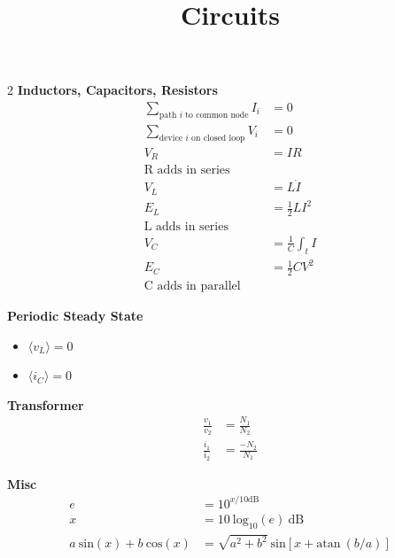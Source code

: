 \documentclass[12pt]{article}
\title{\vspace{-2em}Circuits}
\date{}
\begin{document}
\maketitle

\vspace{-4em}
\begin{multicols}{2}
  \textbf{Inductors, Capacitors, Resistors}
  \begin{align}
    \sum_{\textrm{path $i$ to common node}} I_i &= 0\\
    \sum_{\textrm{device $i$ on closed loop}} V_i &= 0\\
    V_R &= I R\\
    \textrm{R adds in series}&\\
    V_L &= L \dot{I}\\
    E_L &= \frac{1}{2} LI^2\\
    \textrm{L adds in series}&\\
    V_C &= \frac{1}{C} \int_t I\\
    E_C &= \frac{1}{2} CV^2\\
    \textrm{C adds in parallel}&
  \end{align}

  \textbf{Periodic Steady State}
  \begin{itemize}
    \item $\langle v_L \rangle = 0$
    \item $\langle i_C \rangle = 0$
  \end{itemize}

  \textbf{Transformer}
  \begin{align}
    \frac{v_1}{v_2} &= \frac{N_1}{N_2}\\ %
    \frac{i_1}{i_2} &= \frac{-N_2}{N_1} %
  \end{align}

  \textbf{Misc}
  \begin{align}
    e &= 10^{x/10 \textrm{dB}}\\
    x &= 10 \ \textrm{log}_{10}(e) \ \textrm{dB}\\
    a \ \textrm{sin} (x) + b \ \textrm{cos} (x) &= \sqrt{a^2 + b^2} \ \textrm{sin}[x + \textrm{atan} \ (b/a)]
  \end{align}


\end{multicols}
\end{document}
